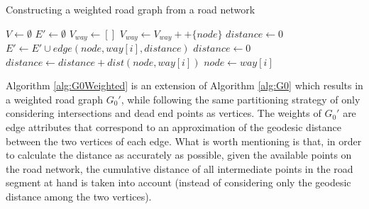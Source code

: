 \documentclass[12pt]{article}
\theoremstyle{definition}
\begin{document}
\begin{algorithm}
  \caption{Constructing a weighted road graph from a road network}
  \label{alg:G0Weighted}
  \begin{algorithmic}
    \State $V \gets \emptyset$
    \State $E' \gets \emptyset$
    \State \({V_{way}\gets []}\)
            \State \(V_{way} \gets V_{way} ++ \{node\}\)
            \EndIf
    \EndFor
    \State \(distance \gets 0\)
     
        \State \(E' \gets E' \cup edge(node, way[i], distance)\)
        \State \(distance \gets 0\)
        \Else 
        \State $distance \gets distance + dist(node, way[i])$
        \State \(node \gets way[i]\)
        \EndIf
    
    \EndFor
    \EndFor
    \EndProcedure
  \end{algorithmic}
\end{algorithm}

Algorithm \ref{alg:G0Weighted} is an extension of Algorithm \ref{alg:G0} which results in a weighted road graph $G_0'$, while following the same partitioning strategy of only considering intersections and dead end points as vertices. The weights of $G_0'$ are edge attributes that correspond to an approximation of the geodesic distance between the two vertices of each edge. What is worth mentioning is that, in order to calculate the distance as accurately as possible, given the available points on the road network, the cumulative distance of all intermediate points in the road segment at hand is taken into account (instead of considering only the geodesic distance among the two vertices). 
\end{document}
